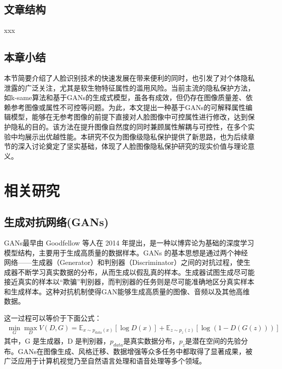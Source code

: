 \documentclass[UTF8,a4paper,12pt]{ctexart}
\numberwithin{equation}{section}
\begin{document}
\subsection{文章结构}
xxx

\subsection{本章小结}

本节简要介绍了人脸识别技术的快速发展在带来便利的同时，也引发了对个体隐私泄露的广泛关注，尤其是软生物特征属性的滥用风险。当前主流的隐私保护方法，如k-same算法和基于GANs的生成式模型，虽各有成效，但仍存在图像质量差、依赖参考图像或属性不可控等问题。为此，本文提出一种基于GANs的可解释属性编辑模型，能够在无参考图像的前提下直接对人脸图像中可控属性进行修改，达到保护隐私的目的。该方法在提升图像自然度的同时兼顾属性解耦与可控性，在多个实验中均展示出优越性能。本研究不仅为图像级隐私保护提供了新思路，也为后续章节的深入讨论奠定了坚实基础，体现了人脸图像隐私保护研究的现实价值与理论意义。

\newpage
{}

\section{相关研究}
\subsection{生成对抗网络(GANs)} 
GANs最早由 Goodfellow 等人在 2014 年提出，是一种以博弈论为基础的深度学习模型结构，主要用于生成高质量的数据样本。GANs 的基本思想是通过两个神经网络——生成器（Generator）和判别器（Discriminator）之间的对抗过程，使生成器不断学习真实数据的分布，从而生成以假乱真的样本。生成器试图生成尽可能接近真实的样本以“欺骗”判别器，而判别器的任务则是尽可能准确地区分真实样本和生成样本。这种对抗机制使得GAN能够生成高质量的图像、音频以及其他高维数据。

这一过程可以等价于下面公式：
\begin{eqnarray} \label{eq2.1}
\min_G \max_D V(D, G) = \mathbb{E}_{x \sim p_{\text{data}}(x)}[\log D(x)] + \mathbb{E}_{z \sim p_z(z)}[\log (1 - D(G(z)))]
\end{eqnarray}
其中，G 是生成器，D 是判别器，$p_{data}$是真实数据分布，$p_z$是潜在空间的先验分布。GANs在图像生成、风格迁移、数据增强等众多任务中都取得了显著成果，被广泛应用于计算机视觉乃至自然语言处理和语音处理等多个领域。
\end{document}

